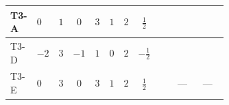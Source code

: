 \documentclass[8pt]{article}
\begin{document}
\begin{landscape}
\begin{longtable}{@{}llcccccc >{\raggedright\arraybackslash}p{0.21\linewidth} >{\raggedright\arraybackslash}p{0.21\linewidth} >{\raggedright\arraybackslash}p{0.21\linewidth}@{}}
\midrule
T3-A & $0$ & $1$ & $0$ & $3$ & $1$ & $2$ & $\frac{1}{2}$ & \scriptsize\adjustbox{max width=\linewidth}{$\begin{gathered} +4 {\lambda_{12}}^2\end{gathered}$} & \scriptsize\adjustbox{max width=\linewidth}{$\begin{gathered} +4 {\lambda_{12}} {\lambda_{S_1}}\end{gathered}$} & \scriptsize\adjustbox{max width=\linewidth}{$\begin{gathered} +8 {\lambda_{12}} {\lambda_{S_2}}\end{gathered}$} \\
\midrule
T3-D & $-2$ & $3$ & $-1$ & $1$ & $0$ & $2$ & $-\frac{1}{2}$ & \scriptsize\adjustbox{max width=\linewidth}{$\begin{gathered} +4 {\lambda_{12}}^2\end{gathered}$} & \scriptsize\adjustbox{max width=\linewidth}{$\begin{gathered} +8 {\lambda_{12}} {\lambda_{S_1}}\end{gathered}$} & \scriptsize\adjustbox{max width=\linewidth}{$\begin{gathered} +4 {\lambda_{12}} {\lambda_{S_2}}\end{gathered}$} \\
\midrule
T3-E & $0$ & $3$ & $0$ & $3$ & $1$ & $2$ & $\frac{1}{2}$ & \scriptsize\adjustbox{max width=\linewidth}{$\begin{gathered} +4 {\lambda_{12}}^2\end{gathered}$} & --- & --- \\
\midrule
\bottomrule
\end{longtable}
\clearpage

\end{landscape}
\end{document}
